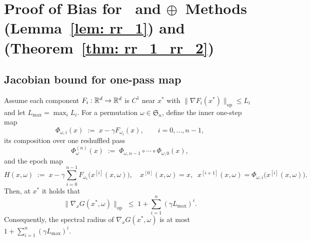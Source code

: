 \section{Proof of Bias for \RRresh\ and \RRresh$\oplus$\RRrom\ Methods\\(Lemma~\ref{lem: rr_1}) and (Theorem~\ref{thm: rr_1_rr_2})}
\label{app: rich-romberg-proofs}
\subsection{Jacobian bound for one-pass map}
\begin{lemma}%
Assume each component $F_i:\mathbb{R}^d\to\mathbb{R}^d$ is $C^1$ near $x^*$ with $\|\nabla F_i(x^*)\|_{\mathrm{op}}\le L_i$ and let $L_{\max}=\max_i L_i$. 
For a permutation $\omega\in\mathfrak{S}_n$, define the inner one-step map
\[
\Phi_{\omega,i}(x)\;:=\;x-\gamma F_{\omega_i}(x),\qquad i=0,\dots,n-1,
\]
its composition over one reshuffled pass
\[
\Phi^{(n)}_{\omega}(x)\;:=\;\Phi_{\omega,n-1}\circ\cdots\circ \Phi_{\omega,0}(x),
\]
and the epoch map
\[
H(x,\omega)\;:=\;x-\gamma\sum_{i=0}^{n-1}F_{\omega_{i}}\big(x^{[i]}(x,\omega)\big),
\quad 
x^{[0]}(x,\omega)=x,\;\;x^{[i+1]}(x,\omega)=\Phi_{\omega,i}\big(x^{[i]}(x,\omega)\big).
\]
Then, at $x^*$ it holds that
\[
\|\nabla_x G(x^*, \omega)\|_{\text{op}}\;\le\;1+\sum_{i=1}^{n}(\gamma L_{\max})^{i}.
\]
Consequently, the spectral radius of $\nabla_x G(x^*, \omega)$ is at most $1+\sum_{i=1}^{n}(\gamma L_{\max})^{i}$.
\end{lemma}
%

